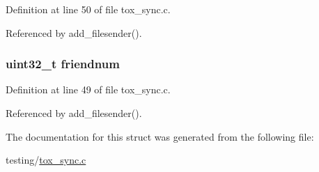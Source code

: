 Definition at line 50 of file tox\+\_\+sync.\+c.



Referenced by add\+\_\+filesender().

\hypertarget{struct_file__t_af02b3246ba69ea99fddd081f6e95598f}{
\subsubsection[{friendnum}]{\setlength{\rightskip}{0pt plus 5cm}uint32\+\_\+t friendnum}}\label{struct_file__t_af02b3246ba69ea99fddd081f6e95598f}


Definition at line 49 of file tox\+\_\+sync.\+c.



Referenced by add\+\_\+filesender().



The documentation for this struct was generated from the following file\+:\begin{DoxyCompactItemize}
\item 
testing/\hyperlink{tox__sync_8c}{tox\+\_\+sync.\+c}\end{DoxyCompactItemize}
